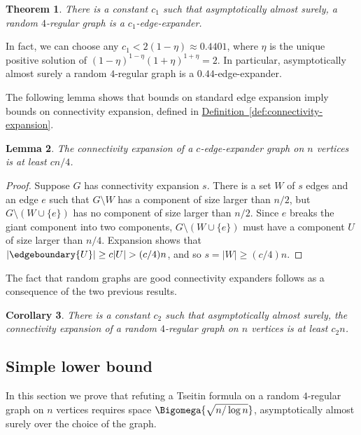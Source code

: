 \documentclass[11pt]{article}
\numberwithin{equation}{section}
\newtheorem{theorem}{Theorem}[section]
\newtheorem{lemma}[theorem]{Lemma}
\newtheorem{corollary}[theorem]{Corollary}
\theoremstyle{definition}
\theoremstyle{plain}
\newcommand{\expref}[2]{\hyperref[#2]{#1~\ref{#2}}}
\begin{document}
%
%

\begin{theorem} \label{thm:expander}
There is a constant $c_1$ such that asymptotically almost surely, a random $4$-regular graph
is a $c_1$-edge-expander.
\end{theorem}

In fact, we can choose any $c_1 < 2(1-\eta) \approx 0.4401$, where $\eta$ is the unique positive solution of $(1-\eta)^{1-\eta} (1+\eta)^{1+\eta} = 2$. In particular, asymptotically almost surely a random $4$-regular graph is a $0.44$-edge-expander.

%
The following lemma shows that bounds on standard edge expansion imply bounds on connectivity expansion, defined in \expref{Definition}{def:connectivity-expansion}.

%
%
%
%
%
%

%
%
%
%
%
%
\begin{lemma} \label{lem:edge-to-connectivity}
  The connectivity expansion of a $c$-edge-expander graph on $n$ vertices is at least $cn/4$.
\end{lemma}
\begin{proof}
  Suppose $G$ has connectivity expansion $s$. There is a set $W$ of $s$ edges and an edge $e$ such that $G \setminus W$ has a component of size larger than $n/2$, but $G \setminus (W \cup \{e\})$ has no component of size larger than $n/2$. Since $e$ breaks the giant component into two components, $G \setminus (W \cup \{e\})$ must have a component $U$ of size larger than $n/4$. Expansion shows that
$|\edgeboundary{U}| \geq c |U| > (c/4) n$, and so $s = |W| \geq (c/4) n$.
\end{proof}

The fact that random graphs are good connectivity expanders follows as a consequence of the two previous results.
\begin{corollary}
\label{cor:splitting}
There is a constant $c_2$ such that asymptotically almost surely, the connectivity expansion
of a random $4$-regular graph on $n$ vertices is at least $c_2n$.
\end{corollary}

\subsection{Simple lower bound} \label{sec:simple}

In this section we prove that refuting a \Gnonsplitting Tseitin formula on a random $4$-regular graph on $n$ vertices requires space $\Bigomega{\sqrt{n/\log n}}$, asymptotically almost surely over the choice of the graph.
\end{document}
